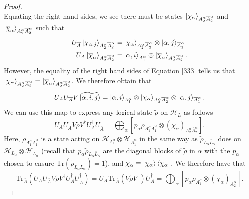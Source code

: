 \documentclass[12pt,a4paper]{report}
\numberwithin{equation}{section}
\newcommand{\ketbra}[2]{\ket{#1}\bra{#2}}
\newcommand{\ketbras}[1]{\ketbra{#1}{#1}}
\newcommand{\ol}[1]{\overline{#1}}
\newcommand{\tr}{\text{Tr}}
\theoremstyle{definition}
\theoremstyle{theorem}
\theoremstyle{theorem}
\theoremstyle{example}
\theoremstyle{definition}
\begin{document}
\begin{proof}
\begin{equation}
	\end{equation}
	Equating the right hand sides, we see there must be states $\ket{\chi_{\alpha}}_{A_{2}^{\alpha}\ol{A}_{2}^{\alpha}}$ and $\ket{\ol{\chi}_{\alpha}}_{A_{2}^{\alpha}\ol{A}_{2}^{\alpha}}$ such that
	\begin{equation}
		\begin{aligned}
			U_{\ol{A}}\ket{\chi_{\alpha,j}}_{A_{2}^{\alpha}\ol{A}_{2}^{\alpha}}&=\ket{\chi_{\alpha}}_{A_{2}^{\alpha}\ol{A}_{2}^{\alpha}}\otimes\ket{\alpha,j}_{\ol{A}_{1}^{\alpha}}\\
			U_{A}\ket{\ol{\chi}_{\alpha}}_{A_{2}^{\alpha}\ol{A}_{2}^{\alpha}}&=\ket{\alpha,i}_{A_{1}^{\alpha}}\otimes\ket{\ol{\chi}_{\alpha}}_{A_{2}^{\alpha}\ol{A}_{2}^{\alpha}}.
		\end{aligned}
	\end{equation}
	However, the equality of the right hand sides of Equation \ref{333} tells us that $\ket{\chi_{\alpha}}_{A_{2}^{\alpha}\ol{A}_{2}^{\alpha}}=\ket{\ol{\chi}_{\alpha}}_{A_{2}^{\alpha}\ol{A}_{2}^{\alpha}}$. We therefore obtain that
	\begin{equation}\label{imp}
		U_{A}U_{\ol{A}}V\ket{\widetilde{\alpha,i,j}}=\ket{\alpha,i}_{A_{1}^{\alpha}}\otimes\ket{\chi_{\alpha}}_{A_{2}^{\alpha}\ol{A}_{2}^{\alpha}}\otimes\ket{\alpha,j}_{\ol{A}_{1}^{\alpha}}.
	\end{equation}
	We can use this map to express any logical state $\tilde{\rho}$ on $\mathcal{H}_{L}$ as follows
	\begin{equation}
		U_{A}U_{\ol{A}}V\tilde{\rho}V^{\dagger}U_{A}^{\dagger}U_{\ol{A}}^{\dagger}=\bigoplus_{\alpha}\left[p_{\alpha}\rho_{A_{1}^{\alpha}\ol{A}_{1}^{\alpha}}\otimes\left(\chi_{\alpha}\right)_{A_{2}^{\alpha}\ol{A}_{2}^{\alpha}}\right].
	\end{equation}
	Here, $\rho_{A_{1}^{\alpha}\ol{A}_{1}^{\alpha}}$ is a state acting on $\mathcal{H}_{A_{1}^{\alpha}}\otimes\mathcal{H}_{\ol{A}_{1}^{\alpha}}$ in the same way as $\tilde{\rho}_{L_{\alpha}\ol{L}_{\alpha}}$ does on $\mathcal{H}_{L_{\alpha}}\otimes\mathcal{H}_{\ol{L}_{\alpha}}$ (recall that $p_{\alpha}\tilde{\rho}_{L_{\alpha}\ol{L}_{\alpha}}$ are the diagonal blocks of $\tilde{\rho}$ in $\alpha$ with the $p_{\alpha}$ chosen to ensure $\tr(\tilde{\rho}_{L_{\alpha}\ol{L}_{\alpha}})=1$), and $\chi_{\alpha}\equiv\ketbras{\chi_{\alpha}}$. We therefore have that
	\begin{equation}\label{asdfgh}
		\tr_{\ol{A}}\left(U_{A}U_{\ol{A}}V\tilde{\rho}V^{\dagger}U_{A}^{\dagger}U_{\ol{A}}^{\dagger}\right)=U_{A}\tr_{\ol{A}}\left(V\tilde{\rho}V^{\dagger}\right)U_{A}^{\dagger}=\bigoplus_{\alpha}\left[p_{\alpha}\rho_{A_{1}^{\alpha}}\otimes\left(\chi_{\alpha}\right)_{A_{2}^{\alpha}}\right].

\end{equation}
\end{proof}
\end{document}
